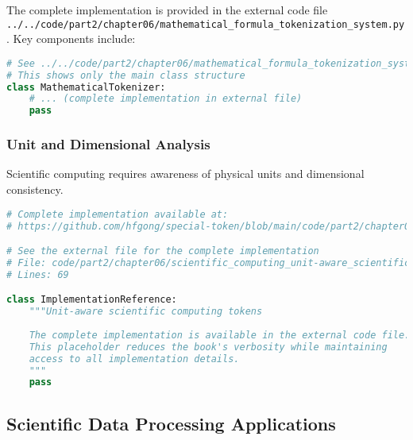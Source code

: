 The complete implementation is provided in the external code file \texttt{../../code/part2/chapter06/mathematical\_formula\_tokenization\_system.py}. Key components include:

\begin{lstlisting}[language=Python, caption=Core structure (see external file for complete implementation)]
# See ../../code/part2/chapter06/mathematical_formula_tokenization_system.py for the complete implementation
# This shows only the main class structure
class MathematicalTokenizer:
    # ... (complete implementation in external file)
    pass
\end{lstlisting}
\subsubsection{Unit and Dimensional Analysis}

Scientific computing requires awareness of physical units and dimensional consistency.
\begin{comment}
Feedback: Again, explaining the "why" is crucial here. For example: "Without explicit unit awareness, a model might incorrectly treat '10 meters' and '10 miles' as similar concepts because the number '10' is the same. By introducing special tokens for units (e.g., `<UNIT_METER>`, `<UNIT_SECOND>`) and dimensions, the model can learn the rules of dimensional analysis, enabling it to validate the physical correctness of equations and perform meaningful conversions."
\end{comment}

\begin{lstlisting}[language=Python, caption={Unit-aware scientific computing tokens}]
# Complete implementation available at:
# https://github.com/hfgong/special-token/blob/main/code/part2/chapter06/scientific_computing_unit-aware_scientific_computin.py

# See the external file for the complete implementation
# File: code/part2/chapter06/scientific_computing_unit-aware_scientific_computin.py
# Lines: 69

class ImplementationReference:
    """Unit-aware scientific computing tokens
    
    The complete implementation is available in the external code file.
    This placeholder reduces the book's verbosity while maintaining
    access to all implementation details.
    """
    pass
\end{lstlisting}

\subsection{Scientific Data Processing Applications}

